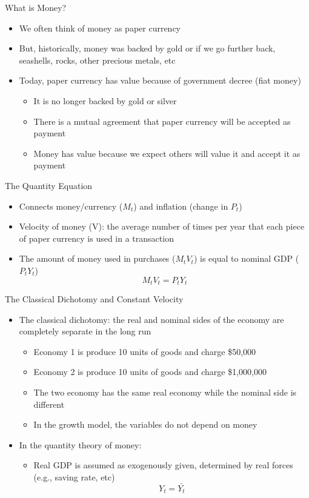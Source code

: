 \documentclass[aspectratio=1610]{beamer}
\begin{document}
\begin{frame}[wide]{What is Money?}
	\begin{itemize}
		\item 	We often think of money as paper currency
		\item But, historically, money was backed by gold or if we go further back, seashells, rocks, other precious metals, etc
		\item Today, paper currency has value because of government decree (fiat money)
		\begin{itemize}
			\item It is no longer backed by gold or silver
			\item There is a mutual agreement that paper currency will be accepted as payment
			\item Money has value because we expect others will value it and accept it as payment
		\end{itemize}
	\end{itemize}
\end{frame}



\begin{frame}[wide]{The Quantity Equation}
	\begin{itemize}
		\item Connects money/currency ($M_t$) and inflation (change in $P_t$)
		\item Velocity of money (V): the average number of times per year that each piece of paper currency is used in a transaction
		\item The amount of money used in purchases ($M_tV_t$) is equal to nominal GDP ($P_tY_t$)
		\[M_t V_t = P_t Y_t\]
	\end{itemize}
\end{frame}

\begin{frame}[wide]{The Classical Dichotomy and Constant Velocity}
	\begin{itemize}
		\item 	The classical dichotomy: the real and nominal sides of the economy are completely separate in the long run
		\begin{itemize}
			\item Economy 1 is produce 10 units of goods and charge \$50,000
			\item Economy 2 is produce 10 units of goods and charge \$1,000,000
			\item The two economy has the same real economy while the nominal side is different
			\item In the growth model, the variables do not depend on money
		\end{itemize}
		\item In the quantity theory of money:
		\begin{itemize}
			\item Real GDP is assumed as exogenously given, determined by real forces (e.g., saving rate, etc)
			\[Y_t = \bar{Y_t}\]
		\end{itemize}
		
	\end{itemize}
\end{frame}
\end{document}
